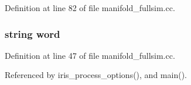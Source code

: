 Definition at line 82 of file manifold\_\-fullsim.cc.
\subsubsection[{word}]{\setlength{\rightskip}{0pt plus 5cm}string {\bf word}}\label{manifold__fullsim_8cc_6e1612f2124fda0de95b60c68c23949a}




Definition at line 47 of file manifold\_\-fullsim.cc.

Referenced by iris\_\-process\_\-options(), and main().